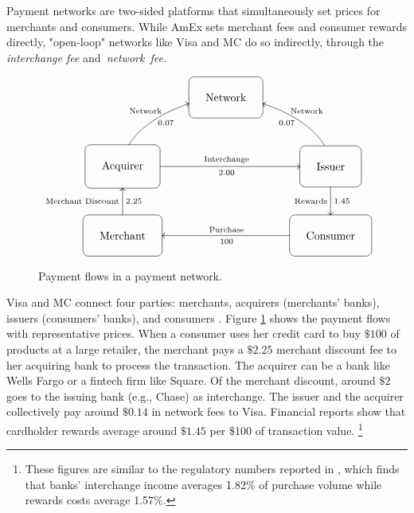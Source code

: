 \documentclass[main.tex]{subfiles}
\begin{document}
Payment networks are two-sided platforms that simultaneously set prices for merchants and consumers.
While AmEx sets merchant fees and consumer rewards directly, "open-loop" networks like Visa and MC do so indirectly, through the \emph{interchange fee} and~\emph{network~fee}.

\begin{figure}
\caption{Payment flows in a payment network. \label{fig:payment-flow}}
\footnotesize
\[
\xymatrix{ & *+++++[F:<5pt>]{\text{Network}}\\
*+++++[F:<5pt>]{\text{Acquirer}}\ar@(u,l)[ru]_{0.07}^{\text{Network\ }}\ar[rr]_{2.00}^{\text{Interchange}} &  & *+++++[F:<5pt>]{\text{Issuer}}\ar@(u,r)[lu]_{\text{\ Network}}^{0.07}\ar[d]_{\text{Rewards}}^{1.45}\\
*+++++[F:<5pt>]{\text{Merchant}}\ar[u]_{2.25}^{\text{Merchant Discount}} &  & *+++++[F:<5pt>]{\text{Consumer}}\ar[ll]_{\text{Purchase}}^{100} }
\]

\end{figure}

Visa and MC connect four parties: merchants, acquirers (merchants' banks), issuers (consumers' banks), and consumers \parencite{Benson.etal2017}.
Figure \ref{fig:payment-flow} shows the payment flows with representative prices.
When a consumer uses her credit card to buy $\$100$ of products at a large retailer,
the merchant pays a $\$2.25$ merchant discount fee to her acquiring bank to process the transaction.
The acquirer can be a bank like Wells Fargo or a fintech firm like Square.
Of the merchant discount, around $\$2$ goes to the issuing bank (e.g., Chase) as interchange.
The issuer and the acquirer collectively pay around $\$0.14$ in network fees to Visa.
Financial reports show that cardholder rewards average around $\$1.45$ per \$100 of transaction value.
\footnote{These figures are similar to the regulatory numbers reported in \textcite{Drechsler.etal2025}, which finds that banks' interchange income averages 1.82\% of purchase volume while rewards costs average 1.57\%.}
\end{document}

